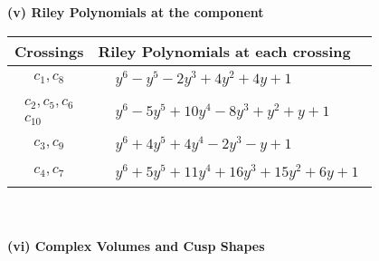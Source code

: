 \documentclass[1p]{elsarticle_modified}
\theoremstyle{definition}
\begin{document}
\newpage\renewcommand{\arraystretch}{1}
\flushleft \textbf{(v) Riley Polynomials at the component}\newline \\
\begin{tabular}{m{50pt}|m{274pt}}
Crossings & \hspace{64pt}Riley Polynomials at each crossing \\
\hline $$\begin{aligned}c_{1},c_{8}\end{aligned}$$&$\begin{aligned}
&y^6- y^5-2 y^3+4 y^2+4 y+1
\end{aligned}$\\
\hline $$\begin{aligned}c_{2},c_{5},c_{6}\\c_{10}\end{aligned}$$&$\begin{aligned}
&y^6-5 y^5+10 y^4-8 y^3+y^2+y+1
\end{aligned}$\\
\hline $$\begin{aligned}c_{3},c_{9}\end{aligned}$$&$\begin{aligned}
&y^6+4 y^5+4 y^4-2 y^3- y+1
\end{aligned}$\\
\hline $$\begin{aligned}c_{4},c_{7}\end{aligned}$$&$\begin{aligned}
&y^6+5 y^5+11 y^4+16 y^3+15 y^2+6 y+1
\end{aligned}$\\
\hline
\end{tabular}\\~\\
\newpage\flushleft \textbf{(vi) Complex Volumes and Cusp Shapes}
\end{document}
